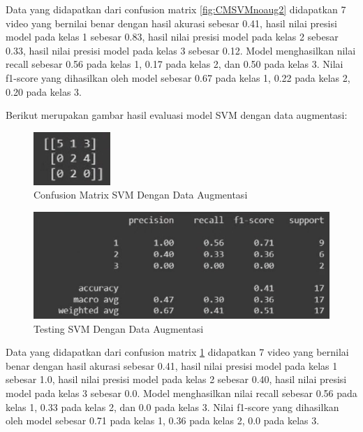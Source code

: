 Data yang didapatkan dari confusion matrix \ref{fig:CMSVMnoaug2} didapatkan 7 video yang bernilai benar
dengan hasil akurasi sebesar 0.41, hasil nilai presisi model pada kelas 1 sebesar 0.83, hasil
nilai presisi model pada kelas 2 sebesar 0.33, hasil nilai presisi model pada kelas 3 sebesar 0.12.
Model menghasilkan nilai recall sebesar 0.56 pada kelas 1, 0.17 pada kelas 2, dan 0.50 pada
kelas 3. Nilai f1-score yang dihasilkan oleh model sebesar 0.67 pada kelas 1, 0.22 pada kelas
2, 0.20 pada kelas 3.

Berikut merupakan gambar hasil evaluasi model SVM dengan data augmentasi:

\begin{figure} [H] \centering
  \includegraphics[scale=5]{gambar/CMSVMaug2.png}
  \caption{Confusion Matrix SVM Dengan Data Augmentasi}
  \label{fig:CMSVMaug2}
\end{figure}

\begin{figure} [H] \centering
  \includegraphics[scale=1]{gambar/scoreSVMaug2.png}
  \caption{Testing SVM Dengan Data Augmentasi}
  \label{fig:ScoreSVMaug2}
\end{figure}

Data yang didapatkan dari confusion matrix \ref{fig:CMSVMaug2} didapatkan 7 video yang bernilai benar
dengan hasil akurasi sebesar 0.41, hasil nilai presisi model pada kelas 1 sebesar 1.0, hasil
nilai presisi model pada kelas 2 sebesar 0.40, hasil nilai presisi model pada kelas 3 sebesar 0.0.
Model menghasilkan nilai recall sebesar 0.56 pada kelas 1, 0.33 pada kelas 2, dan 0.0 pada
kelas 3. Nilai f1-score yang dihasilkan oleh model sebesar 0.71 pada kelas 1, 0.36 pada kelas
2, 0.0 pada kelas 3.

